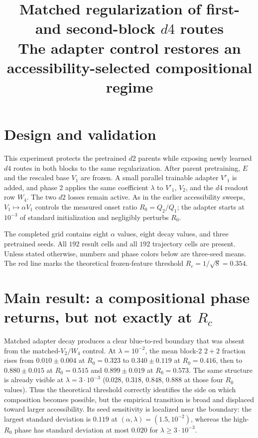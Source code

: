 \documentclass[10pt]{article}
\title{\vspace{-1.35cm}Matched regularization of first- and second-block $d4$ routes\\
\large The adapter control restores an accessibility-selected compositional regime}
\author{}
\date{\vspace{-1.15cm}}
\begin{document}
\maketitle
\vspace{-1.8cm}

\section*{Design and validation}
This experiment protects the pretrained $d2$ parents while exposing newly learned $d4$
routes in both blocks to the same regularization.  After parent pretraining, $E$ and the
rescaled base $V_1$ are frozen.  A small parallel trainable adapter $V'_1$ is added, and
phase 2 applies the same coefficient $\lambda$ to $V'_1$, $V_2$, and the $d4$ readout row
$W_4$.  The two $d2$ losses remain active.  As in the earlier accessibility sweeps,
$V_1\mapsto\alpha V_1$ controls the measured onset ratio $R_0=Q_2/Q_1$; the adapter starts
at $10^{-3}$ of standard initialization and negligibly perturbs $R_0$.

The completed grid contains eight $\alpha$ values, eight decay values, and three pretrained
seeds.  All $192$ result cells and all $192$ trajectory cells are present.  Unless stated
otherwise, numbers and phase colors below are three-seed means.  The red line marks the
theoretical frozen-feature threshold $R_c=1/\sqrt{8}=0.354$.

\section*{Main result: a compositional phase returns, but not exactly at $R_c$}
Matched adapter decay produces a clear blue-to-red boundary that was absent from the
matched-$V_2/W_4$ control.  At $\lambda=10^{-2}$, the mean block-2 $2{+}2$ fraction rises
from $0.010\pm0.004$ at $R_0=0.323$ to $0.340\pm0.119$ at $R_0=0.416$, then to
$0.880\pm0.015$ at $R_0=0.515$ and $0.899\pm0.019$ at $R_0=0.573$.  The same structure is
already visible at $\lambda=3\cdot10^{-3}$ ($0.028$, $0.318$, $0.848$, $0.888$ at those
four $R_0$ values).  Thus the theoretical threshold correctly identifies the side on which
composition becomes possible, but the empirical transition is broad and displaced toward
larger accessibility.  Its seed sensitivity is localized near the boundary: the largest
standard deviation is $0.119$ at $(\alpha,\lambda)=(1.5,10^{-2})$, whereas the high-$R_0$
phase has standard deviation at most $0.020$ for $\lambda\geq3\cdot10^{-3}$.
\end{document}
